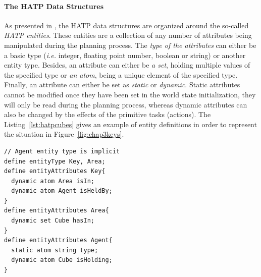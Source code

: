 \documentclass[a4paper,11pt,twoside]{StyleThese}
\begin{document}

\paragraph{The HATP Data Structures}
As presented in \cite{de2015hatp}, the HATP data structures are organized around the so-called \textit{HATP entities}. These entities are a collection of any number of attributes being manipulated during the planning process. The \textit{type of the attributes} can either be a basic type (\textit{i.e.} integer, floating point number, boolean or string) or another entity type. Besides, an attribute can either be \textit{a set}, holding multiple values of the specified type or \textit{an atom}, being a unique element of the specified type. Finally, an attribute can either be set as \textit{static} or \textit{dynamic}. Static attributes cannot be modified once they have been set in the world state initialization, they will only be read during the planning process, whereas dynamic attributes can also be changed by the effects of the primitive tasks (actions). The Listing~\ref{lst:hatpcubes} gives an example of entity definitions in order to represent the situation in Figure~\ref{fig:chap3keys}.

\begin{lstlisting}[caption={Example of a part of the HATP domain describing the situation of Figure~\ref{fig:chap3keys}.}, label={lst:hatpcubes}, emph={define, entityType, entityAttributes, dynamic, atom, set, static}, emphstyle={\bfseries}, captionpos=b, frame=single]
// Agent entity type is implicit
define entityType Key, Area;
define entityAttributes Key{
  dynamic atom Area isIn;
  dynamic atom Agent isHeldBy;
}
define entityAttributes Area{
  dynamic set Cube hasIn;
}
define entityAttributes Agent{
  static atom string type;
  dynamic atom Cube isHolding;
}
\end{lstlisting}
\end{document}
